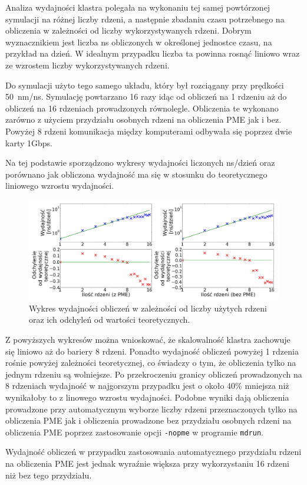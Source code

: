 Analiza wydajności klastra polegała na wykonaniu tej samej powtórzonej symulacji na różnej liczby rdzeni, a następnie zbadaniu czasu potrzebnego na obliczenia w zależności od liczby wykorzystywanych rdzeni. Dobrym wyznacznikiem jest liczba ns obliczonych w określonej jednostce czasu, na przykład na dzień. W idealnym przypadku liczba ta powinna rosnąć liniowo wraz ze wzrostem liczby wykorzystywanych rdzeni. 

Do symulacji użyto tego samego układu, który był rozciągany przy prędkości 50~nm/ns. Symulację powtarzano 16 razy idąc od obliczeń na 1 rdzeniu aż do obliczeń na 16 rdzeniach prowadzonych równolegle. Obliczenia te wykonano zarówno z użyciem przydziału osobnych rdzeni na obliczenia PME jak i bez. Powyżej 8 rdzeni komunikacja między komputerami odbywała się poprzez dwie karty 1Gbps. 

Na tej podstawie sporządzono wykresy wydajności liczonych ns/dzień oraz porównano jak obliczona wydajność ma się w stosunku do teoretycznego liniowego wzrostu wydajności. 

\begin{center}
\begin{figure}[h!]
\begin{centering}
\includegraphics[width=150mm]{./rys/wyd.png}
\caption{Wykres wydajności obliczeń w zależności od liczby użytych rdzeni oraz ich odchyleń od wartości teoretycznych.}
\end{centering}
\end{figure}
\end{center}

Z powyższych wykresów można wnioskować, że skalowalność klastra zachowuje się liniowo aż do bariery 8 rdzeni. Ponadto wydajność obliczeń powyżej 1 rdzenia rośnie powyżej zależności teoretycznej, co świadczy o tym, że obliczenia tylko na jednym rdzeniu są wolniejsze. Po przekroczeniu granicy obliczeń prowadzonych na 8 rdzeniach wydajność w najgorszym przypadku jest o około 40\% mniejsza niż wynikałoby to z linowego wzrostu wydajności. Podobne wyniki dają obliczenia prowadzone przy automatycznym wyborze liczby rdzeni przeznaczonych tylko na obliczenia PME jak i obliczenia prowadzone bez przydziału osobnych rdzeni na obliczenia PME poprzez zastosowanie opcji \texttt{-nopme} w programie \texttt{mdrun}.

Wydajność obliczeń w przypadku zastosowania automatycznego przydziału rdzeni na obliczenia PME jest jednak wyraźnie większa przy wykorzystaniu 16 rdzeni niż bez tego przydziału. 
